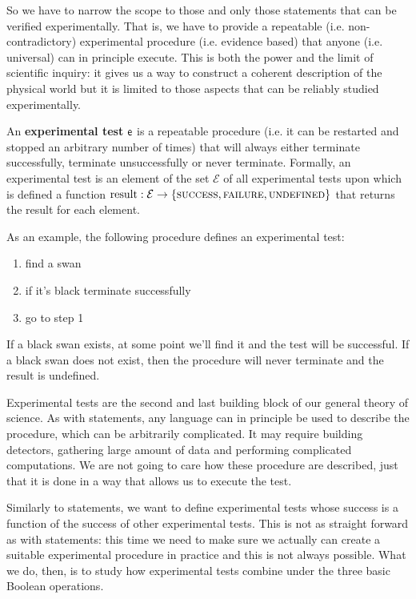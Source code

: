 \documentclass[11pt,letterpaper,fleqn]{memoir} %
\begin{document}
So we have to narrow the scope to those and only those statements that can be verified experimentally. That is, we have to provide a repeatable (i.e. non-contradictory) experimental procedure (i.e. evidence based) that anyone (i.e. universal) can in principle execute. This is both the power and the limit of scientific inquiry: it gives us a way to construct a coherent description of the physical world but it is limited to those aspects that can be reliably studied experimentally.

\begin{mathSection}
\begin{defn}\label{def_experimental_tests}
	An \textbf{experimental test} $\mathsf{e}$ is a repeatable procedure (i.e. it can be restarted and stopped an arbitrary number of times) that will always either terminate successfully, terminate unsuccessfully or never terminate. Formally, an experimental test is an element of the set $\mathcal{E}$ of all experimental tests upon which is defined a function $\operatorname{result}: \mathcal{E} \to \{\textsc{success}, \textsc{failure}, \textsc{undefined}\}$ that returns the result for each element.
\end{defn}
\end{mathSection}

As an example, the following procedure defines an experimental test:
\begin{enumerate}
	\item find a swan
	\item if it's black terminate successfully
	\item go to step 1
\end{enumerate}
If a black swan exists, at some point we'll find it and the test will be successful. If a black swan does not exist, then the procedure will never terminate and the result is undefined.

Experimental tests are the second and last building block of our general theory of science. As with statements, any language can in principle be used to describe the procedure, which can be arbitrarily complicated. It may require building detectors, gathering large amount of data and performing complicated computations. We are not going to care how these procedure are described, just that it is done in a way that allows us to execute the test.

Similarly to statements, we want to define experimental tests whose success is a function of the success of other experimental tests. This is not as straight forward as with statements: this time we need to make sure we actually can create a suitable experimental procedure in practice and this is not always possible. What we do, then, is to study how experimental tests combine under the three basic Boolean operations.
\end{document}
